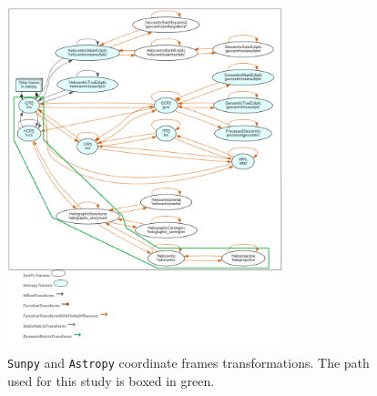     \begin{figure}[H]
        \centering
        \includegraphics[width = 8cm]{report/Figures/methods/coordinates.png}
        \caption{\texttt{Sunpy} and \texttt{Astropy} coordinate frames transformations. The path used for this study is boxed in green.}
        \label{coordinates}
    \end{figure}

